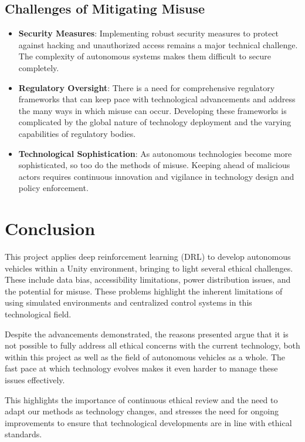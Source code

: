 \documentclass[10pt,twocolumn]{article}
\begin{document}
\subsection{Challenges of Mitigating Misuse}
    \begin{itemize}
        \item \textbf{Security Measures}: Implementing robust security measures to protect against hacking and unauthorized access remains a major technical challenge. The complexity of autonomous systems makes them difficult to secure completely.
        \item \textbf{Regulatory Oversight}: There is a need for comprehensive regulatory frameworks that can keep pace with technological advancements and address the many ways in which misuse can occur. Developing these frameworks is complicated by the global nature of technology deployment and the varying capabilities of regulatory bodies.
        \item \textbf{Technological Sophistication}: As autonomous technologies become more sophisticated, so too do the methods of misuse. Keeping ahead of malicious actors requires continuous innovation and vigilance in technology design and policy enforcement.
    \end{itemize}


\section{Conclusion}

This project applies deep reinforcement learning (DRL) to develop autonomous vehicles within a Unity environment, bringing to light several ethical challenges. These include data bias, accessibility limitations, power distribution issues, and the potential for misuse. These problems highlight the inherent limitations of using simulated environments and centralized control systems in this technological field.

Despite the advancements demonstrated, the reasons presented argue that it is not possible to fully address all ethical concerns with the current technology, both within this project as well as the field of autonomous vehicles as a whole. The fast pace at which technology evolves makes it even harder to manage these issues effectively.

This highlights the importance of continuous ethical review and the need to adapt our methods as technology changes, and stresses the need for ongoing improvements to ensure that technological developments are in line with ethical standards.

\printbibliography
\end{document}
